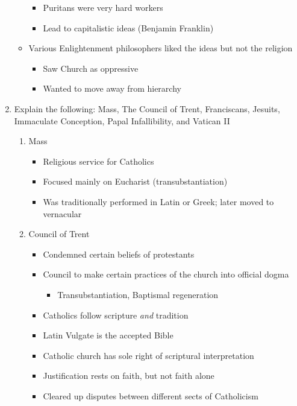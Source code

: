 \documentclass[8pt]{article}
\begin{document}
\begin{enumerate}
\begin{itemize}
\begin{itemize}
            \item Puritans were very hard workers
            \item Lead to capitalistic ideas (Benjamin Franklin)
        \end{itemize}
        \item Various Enlightenment philosophers liked the ideas but not the religion
        \begin{itemize}
            \item Saw Church as oppressive
            \item Wanted to move away from hierarchy
        \end{itemize}
    \end{itemize}

    \item Explain the following: Mass, The Council of Trent, Franciscans, Jesuits, Immaculate Conception, Papal Infallibility, and Vatican II
    \begin{enumerate}
        \item Mass
        \begin{itemize}
            \item Religious service for Catholics
            \item Focused mainly on Eucharist (transubstantiation)
            \item Was traditionally performed in Latin or Greek; later moved to vernacular
        \end{itemize}
        \item Council of Trent
        \begin{itemize}
            \item Condemned certain beliefs of protestants
            \item Council to make certain practices of the church into official dogma
            \begin{itemize}
                \item Transubstantiation, Baptismal regeneration
            \end{itemize}
            \item Catholics follow scripture \textit{and} tradition
            \item Latin Vulgate is the accepted Bible
            \item Catholic church has sole right of scriptural interpretation
            \item Justification rests on faith, but not faith alone
            \item Cleared up disputes between different sects of Catholicism

\end{itemize}
\end{enumerate}
\end{enumerate}
\end{document}
